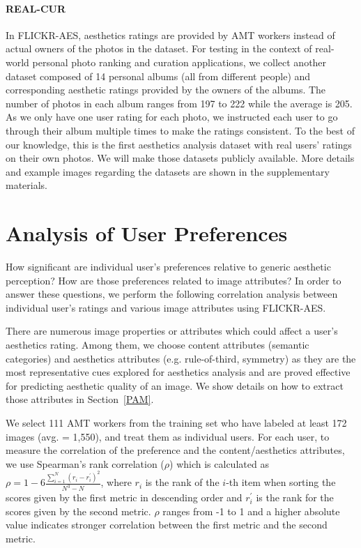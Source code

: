 \paragraph{REAL-CUR}
In FLICKR-AES, aesthetics ratings are provided by AMT workers instead of actual owners of the photos in the dataset. For testing in the context of real-world personal photo ranking and curation applications, we collect another dataset composed of 14 personal albums (all from different people) and corresponding aesthetic ratings provided by the owners of the albums. The number of photos in each album ranges from 197 to 222 while the average is 205. As we only have one user rating for each photo, we instructed each user to go through their album multiple times to make the ratings consistent. To the best of our knowledge, this is the first aesthetics analysis dataset with real users' ratings on their own photos. We will make those datasets publicly available. More details and example images regarding the datasets are shown in the supplementary materials.



\section{Analysis of User Preferences}\label{analysis}
How significant are individual user's preferences relative to generic aesthetic perception? How are those preferences related to image attributes? In order to answer these questions, we perform the following correlation analysis between individual user's ratings and various image attributes using FLICKR-AES.

There are numerous image properties or attributes which could affect a user's aesthetics rating. Among them, we choose content attributes (semantic categories) and aesthetics attributes (e.g. rule-of-third, symmetry) as they are the most representative cues explored for aesthetics analysis and are proved effective for predicting aesthetic quality of an image\cite{dhar2011high, luo2011content}. We show  details on how to extract those attributes in Section~\ref{PAM}. 

We select 111 AMT workers from the training set who have labeled at least 172 images (avg. = 1,550), and treat them as individual users. For each user, to measure the correlation of the preference and the content/aesthetics attributes, we use Spearman's rank correlation ($\rho$) \cite{myers2010research} which is calculated as $\rho = 1 - 6\frac{\sum_{i=1}^{N}{(r_i - r_{i}^{'})}^2}{N^3 - N}$, where $r_i$ is the rank of the $i$-th item when sorting the scores given by the first metric in descending order and $r_{i}^{'}$ is the rank for the scores given by the second metric. $\rho$ ranges from -1 to 1 and a higher absolute value indicates stronger correlation between the first metric and the second metric. 

